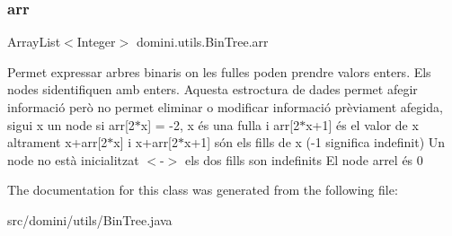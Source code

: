 \subsubsection{\texorpdfstring{arr}{arr}}
{\footnotesize\ttfamily Array\+List$<$Integer$>$ domini.\+utils.\+Bin\+Tree.\+arr\hspace{0.3cm}{\ttfamily [private]}}

Permet expressar arbres binaris on les fulles poden prendre valors enters. Els nodes s\textquotesingle{}identifiquen amb enters. Aquesta estroctura de dades permet afegir informació però no permet eliminar o modificar informació prèviament afegida, sigui x un node si arr\mbox{[}2$\ast$x\mbox{]} = -\/2, x és una fulla i arr\mbox{[}2$\ast$x+1\mbox{]} és el valor de x altrament x+arr\mbox{[}2$\ast$x\mbox{]} i x+arr\mbox{[}2$\ast$x+1\mbox{]} són els fills de x (-\/1 significa indefinit) Un node no està inicialitzat $<$-\/$>$ els dos fills son indefinits El node arrel és 0 

The documentation for this class was generated from the following file\+:\begin{DoxyCompactItemize}
\item 
src/domini/utils/Bin\+Tree.\+java\end{DoxyCompactItemize}
